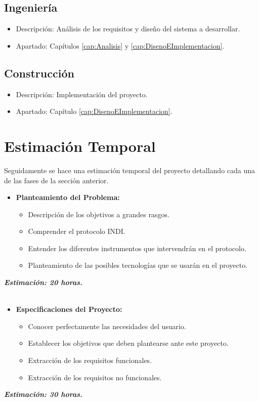\subsection{Ingeniería}
\begin{itemize}
  \item Descripción: Análisis de los requisitos y diseño del sistema a desarrollar.
  \item Apartado: Capítulos \ref{cap:Analisis} y \ref{cap:DisenoEImplementacion}.\\
\end{itemize}

\subsection{Construcción}
\begin{itemize}
  \item Descripción: Implementación del proyecto.
  \item Apartado: Capítulo \ref{cap:DisenoEImplementacion}.\\
\end{itemize}


\section{Estimación Temporal}
Seguidamente se hace una estimación temporal del proyecto detallando cada una de las fases de la sección anterior.

\begin{itemize}
  \item \textbf{Planteamiento del Problema:}
  \begin{itemize}
    \item Descripción de los objetivos a grandes rasgos.
    \item Comprender el protocolo INDI.
    \item Entender los diferentes instrumentos que intervendrán en el protocolo.
    \item Planteamiento de las posibles tecnologías que se usarán en el proyecto.
  \end{itemize}
\end{itemize}
\textit{\textbf{Estimación: 20 horas.}}\\ \\

\begin{itemize}
  \item \textbf{Especificaciones del Proyecto:}
  \begin{itemize}
    \item Conocer perfectamente las necesidades del usuario.
    \item Establecer los objetivos que deben plantearse ante este proyecto.
    \item Extracción de los requisitos funcionales.
    \item Extracción de los requisitos no funcionales.
  \end{itemize}
\end{itemize}
\textit{\textbf{Estimación: 30 horas.}}\\ \\

